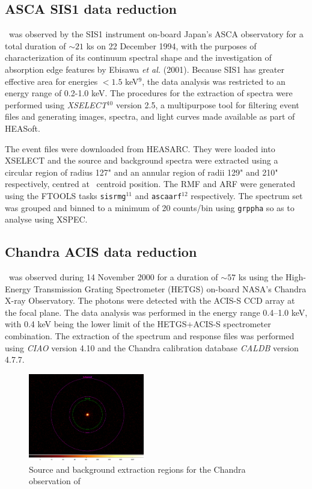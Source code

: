     \subsection{ASCA SIS1 data reduction}
    	\source\ was observed by the SIS1 instrument on-board Japan's ASCA observatory for a total duration of $\sim 21$ ks on 22 December 1994, with the purposes of characterization of its continuum spectral shape and the investigation of absorption edge features by Ebisawa \textit{et al.} (2001). %
    	Because SIS1 has greater effective area for energies $<1.5$ keV$^9$, the data analysis was restricted to an energy range of 0.2-1.0 keV. The procedures for the extraction of spectra were performed using \textit{XSELECT}$^{10}$ version 2.5, a multipurpose tool for filtering event files and generating images, spectra, and light curves made available as part of HEASoft.
    	
    	The event files were downloaded from HEASARC. They were loaded into XSELECT and the source and background spectra were extracted using a circular region of radius 127" and an annular region of radii 129" and 210" respectively, centred at \source\ centroid position. The RMF and ARF were generated using the FTOOLS tasks \texttt{sisrmg}$^{11}$ and \texttt{ascaarf}$^{12}$ respectively. The spectrum set was grouped and binned to a minimum of 20 counts/bin using \texttt{grppha} so as to analyse using XSPEC.
    
    \subsection{Chandra ACIS data reduction}
    	\source\ was observed during 14 November 2000 for a duration of $\sim 57$ ks using the High-Energy Transmission Grating Spectrometer (HETGS) on-board NASA's Chandra X-ray Observatory. %
    	The photons were detected with the ACIS-S CCD array at the focal plane. The data analysis was performed in the energy range 0.4--1.0 keV, with 0.4 keV being the lower limit of the HETGS+ACIS-S spectrometer combination. The extraction of the spectrum and response files was performed using \textit{CIAO} version 4.10 and the Chandra calibration database \textit{CALDB} version 4.7.7.
    	\begin{figure}[!htb]
	        \centering
	        \includegraphics[width=0.45\textwidth]{figures/rx-j0925-7-4758_644_src-bkg.png}
	        \caption{Source and background extraction regions for the Chandra observation of \source}
	        \label{fig:src-bkg:acis}
	    \end{figure}
    	
